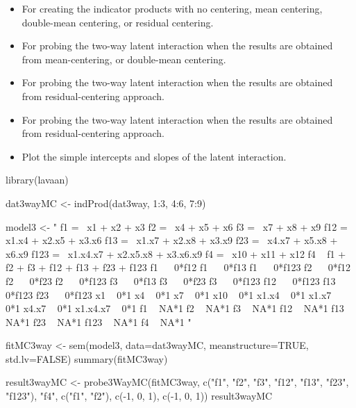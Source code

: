 \documentclass[a4paper]{book}
\begin{document}
\begin{SeeAlso}\relax
\begin{itemize}

\item {} For creating the indicator products with no centering, mean centering, double-mean centering, or residual centering.
\item {} For probing the two-way latent interaction when the results are obtained from mean-centering, or double-mean centering.
\item {} For probing the two-way latent interaction when the results are obtained from residual-centering approach.
\item {} For probing the two-way latent interaction when the results are obtained from residual-centering approach.
\item {} Plot the simple intercepts and slopes of the latent interaction.

\end{itemize}

\end{SeeAlso}
%
\begin{Examples}
\begin{ExampleCode}
library(lavaan)

dat3wayMC <- indProd(dat3way, 1:3, 4:6, 7:9)

model3 <- "
f1 =~ x1 + x2 + x3
f2 =~ x4 + x5 + x6
f3 =~ x7 + x8 + x9
f12 =~ x1.x4 + x2.x5 + x3.x6
f13 =~ x1.x7 + x2.x8 + x3.x9
f23 =~ x4.x7 + x5.x8 + x6.x9
f123 =~ x1.x4.x7 + x2.x5.x8 + x3.x6.x9
f4 =~ x10 + x11 + x12
f4 ~ f1 + f2 + f3 + f12 + f13 + f23 + f123
f1 ~~ 0*f12
f1 ~~ 0*f13
f1 ~~ 0*f123
f2 ~~ 0*f12
f2 ~~ 0*f23
f2 ~~ 0*f123
f3 ~~ 0*f13
f3 ~~ 0*f23
f3 ~~ 0*f123
f12 ~~ 0*f123
f13 ~~ 0*f123
f23 ~~ 0*f123
x1 ~ 0*1
x4 ~ 0*1
x7 ~ 0*1
x10 ~ 0*1
x1.x4 ~ 0*1
x1.x7 ~ 0*1
x4.x7 ~ 0*1
x1.x4.x7 ~ 0*1
f1 ~ NA*1
f2 ~ NA*1
f3 ~ NA*1
f12 ~ NA*1
f13 ~ NA*1
f23 ~ NA*1
f123 ~ NA*1
f4 ~ NA*1
" 

fitMC3way <- sem(model3, data=dat3wayMC, meanstructure=TRUE, std.lv=FALSE)
summary(fitMC3way)

result3wayMC <- probe3WayMC(fitMC3way, c("f1", "f2", "f3", "f12", "f13", "f23", "f123"), 
	"f4", c("f1", "f2"), c(-1, 0, 1), c(-1, 0, 1))
result3wayMC
\end{ExampleCode}
\end{Examples}
\end{document}
